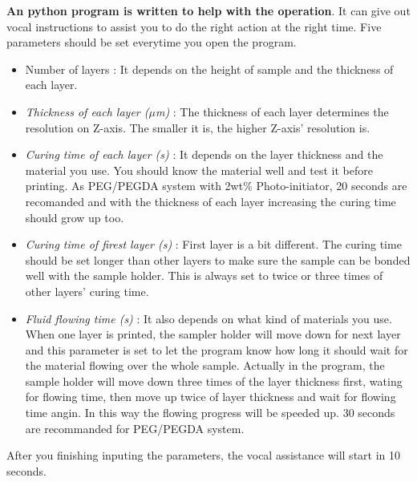 \documentclass[a4paper]{article}
\begin{document}
\textbf{An python program is written to help with the operation}. It can give out vocal instructions to assist 
you to do the right action at the right time. Five parameters should be set everytime you open the program.
\begin{itemize}   
    \item Number of layers : It depends on the height of sample and the thickness of each layer. 
    \item \textit{Thickness of each layer ($\mu$m)} : The thickness of each layer determines the resolution on Z-axis. 
        The smaller it is, the higher Z-axis' resolution is.
    \item \textit{Curing time of each layer (s)} : It depends on the layer thickness and the material you use. You 
        should know the material well and test it before printing. As PEG/PEGDA system with 2wt\% Photo-initiator, 
        20 seconds are recomanded and with the thickness of each layer increasing the curing time should grow up too.
    \item \textit{Curing time of firest layer (s)} : First layer is a bit different. The curing time should be set longer 
        than other layers to make sure the sample can be bonded well with the sample holder. This is always set to twice 
        or three times of other layers' curing time.
    \item \textit{Fluid flowing time (s)} : It also depends on what kind of materials you use. When one layer is printed, 
        the sampler holder will move down for next layer and this parameter is set to let the program know how long it 
        should wait for the material flowing over the whole sample. Actually in the program, the sample holder will move 
        down three times of the layer thickness first, wating for flowing time, then move up twice of layer thickness and 
        wait  for flowing time angin. In this way the flowing progress will be speeded up. 30 seconds are recommanded for 
        PEG/PEGDA system.
\end{itemize}
After you finishing inputing the parameters, the vocal assistance will start in 10 seconds.             
\end{document}

